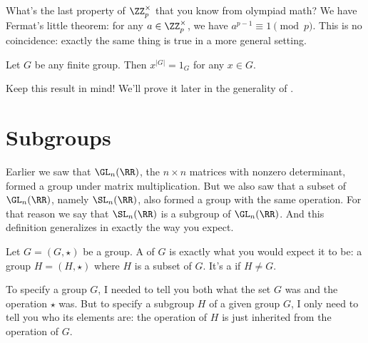 What's the last property of $\Zm p$ that you know from olympiad math?
We have Fermat's little theorem: for any $a \in \Zm p$,
we have $a^{p-1} \equiv 1 \pmod p$.
This is no coincidence:
exactly the same thing is true in a more general setting.

\begin{theorem}
	Let $G$ be any finite group.
	Then $x^{\left\lvert G \right\rvert} = 1_G$ for any $x \in G$.
\end{theorem}
Keep this result in mind! We'll prove it later in
the generality of .

\section{Subgroups}
Earlier we saw that $\GL_n(\RR)$, the $n \times n$ matrices with nonzero determinant, formed a group under matrix multiplication.
But we also saw that a subset of $\GL_n(\RR)$, namely $\SL_n(\RR)$, also formed a group with the same operation.
For that reason we say that $\SL_n(\RR)$ is a subgroup of $\GL_n(\RR)$.
And this definition generalizes in exactly the way you expect.

\begin{definition}
	Let $G = (G, \star)$ be a group.
	A  of $G$ is exactly what you would expect it to be:
	a group $H = (H, \star)$ where $H$ is a subset of $G$.
	It's a  if $H \neq G$.
\end{definition}

\begin{remark}
	To specify a group $G$, I needed to tell you both what the set $G$ was and the operation $\star$ was.
	But to specify a subgroup $H$ of a given group $G$, I only need to tell you who its elements are: the operation of $H$ is just inherited from the operation of $G$.
\end{remark}

